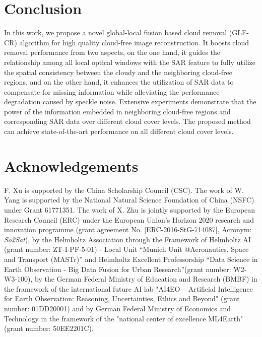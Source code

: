 \documentclass[a4paper,fleqn]{cas-dc}
\begin{document}
\section{Conclusion}
In this work, we propose a novel global-local fusion based cloud removal (GLF-CR) algorithm for high quality cloud-free image reconstruction.  
It boosts cloud removal performance from two aspects, on the one hand, it guides the relationship among all local optical windows with the SAR feature to fully utilize the spatial consistency between the cloudy and the neighboring cloud-free regions, and on the other hand, it enhances the utilization of SAR data to compensate for missing information while alleviating the performance degradation caused by speckle noise. Extensive experiments demonstrate that the power of the information embedded in neighboring cloud-free regions and corresponding SAR data over different cloud cover levels. The proposed method can achieve state-of-the-art performance on all different cloud cover levels.

\section*{Acknowledgements}

F. Xu is supported by the China Scholarship Council (CSC). The work of W. Yang is supported by the National Natural Science Foundation of China (NSFC) under Grant 61771351. The work of X. Zhu is jointly supported by the European Research Council (ERC) under the European Union's Horizon 2020 research and innovation programme (grant agreement No. [ERC-2016-StG-714087], Acronym: \textit{So2Sat}), by the Helmholtz Association
through the Framework of Helmholtz AI (grant  number:  ZT-I-PF-5-01) - Local Unit ``Munich Unit @Aeronautics, Space and Transport (MASTr)'' and Helmholtz Excellent Professorship ``Data Science in Earth Observation - Big Data Fusion for Urban Research''(grant number: W2-W3-100), by the German Federal Ministry of Education and Research (BMBF) in the framework of the international future AI lab "AI4EO -- Artificial Intelligence for Earth Observation: Reasoning, Uncertainties, Ethics and Beyond" (grant number: 01DD20001) and by German Federal Ministry of Economics and Technology in the framework of the "national center of excellence ML4Earth" (grant number: 50EE2201C).


























\end{document}
